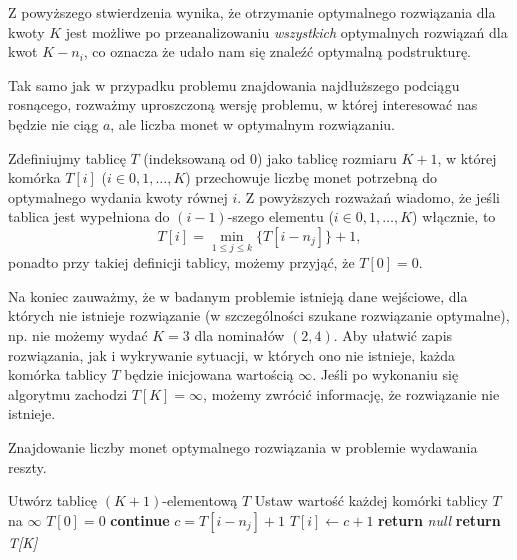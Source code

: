 Z powyższego stwierdzenia wynika, że otrzymanie optymalnego 
rozwiązania dla kwoty $K$ jest możliwe po przeanalizowaniu 
\emph{wszystkich} optymalnych rozwiązań dla kwot $K - n_i$,
co oznacza że udało nam się znaleźć optymalną podstrukturę.

Tak samo jak w przypadku problemu znajdowania najdłuższego 
podciągu rosnącego, rozważmy uproszczoną wersję problemu, 
w której interesować nas będzie nie ciąg $a$, ale 
liczba monet w optymalnym rozwiązaniu. 

Zdefiniujmy tablicę $T$ (indeksowaną od $0$) jako 
tablicę rozmiaru $K + 1$, w której komórka $T[i]$ ($i \in {0, 1, \ldots, K}$)
przechowuje liczbę monet potrzebną do optymalnego wydania kwoty równej $i$.
Z powyższych rozważań
wiadomo, że jeśli tablica jest wypełniona do $(i-1)$-szego
elementu ($i \in {0, 1, \ldots, K}$) włącznie, to 
\begin{equation}
	T[i] = \min_{1 \leq j \leq k}\{T[i - n_j]\} + 1,
	\label{eq:min_change_making_relation}
\end{equation}
ponadto przy takiej definicji tablicy, możemy przyjąć, że $T[0] = 0$.

Na koniec zauważmy, że w badanym problemie
istnieją dane wejściowe, dla których nie 
istnieje rozwiązanie (w szczególności szukane rozwiązanie optymalne),
np. nie możemy wydać $K=3$ dla nominałów $(2, 4)$. 
Aby ułatwić zapis rozwiązania, jak i wykrywanie sytuacji, w których
ono nie istnieje, każda komórka tablicy $T$ będzie inicjowana
wartością $\infty$. Jeśli po wykonaniu się algorytmu zachodzi $T[K] = \infty$,
możemy zwrócić informację, że rozwiązanie nie istnieje.

\begin{algorithm}[H]
	\caption{Znajdowanie liczby monet optymalnego 
		rozwiązania w problemie wydawania reszty.}\label{MinCoinsCountChangeMaking}
	\begin{algorithmic}[1]
		\State Utwórz tablicę $(K+1)$-elementową $T$
		\State Ustaw wartość każdej komórki tablicy $T$ na $\infty$
		\State $T[0] = 0$
		 \textbf{continue}
		\EndIf
		\State $c = T[i - n_j] + 1$
		 $T[i] \gets c + 1$
		\EndIf
		\EndFor
		\EndFor
		 \textbf{return} \textit{null}
		\EndIf
		\State \textbf{return} \textit{T[K]}
		\EndProcedure
	\end{algorithmic}
\end{algorithm}

